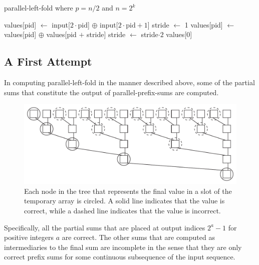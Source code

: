 \documentclass[12pt,twoside]{reedthesis}
\begin{document}
\begin{algorithm}[h!]
\caption{parallel-left-fold where $p = n/2$ and $n=2^k$}
\begin{algorithmic}
\STATE values[pid] $\leftarrow$ input[$2\cdot \mbox{pid}$] $\oplus$ input[$2\cdot \mbox{pid} +1$]
\STATE stride $\leftarrow$ 1
\STATE values[pid] $\leftarrow$ values[pid] $\oplus$ values[pid $+$ stride] 
\STATE stride $\leftarrow$ stride$\cdot 2$
\ENDWHILE
\RETURN values[0]
\end{algorithmic}
\end{algorithm}


\vspace{3pc}
\subsection{A First Attempt}

In computing parallel-left-fold in the manner described above, some of the partial sums that constitute the output of parallel-prefix-sums are computed.

\begin{figure}[h]
\includegraphics[scale = .75]{correctsums.pdf}
\caption{Each node in the tree that represents the final value in a slot of the temporary array is circled. A solid line indicates that the value is correct, while a dashed line indicates that the value is incorrect.}
\end{figure}
\vspace{1pc}

Specifically, all the partial sums that are placed at output indices
$2^a-1$ for positive integers $a$ are correct. The other sums that are
computed as intermediaries to the final sum are incomplete in the
sense that they are only correct prefix sums for some continuous
subsequence of the input sequence.
\end{document}
